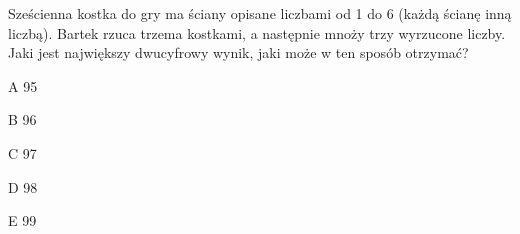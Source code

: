 \begin{tresc}
Sześcienna kostka do gry ma ściany opisane liczbami od 1 do 6 (każdą ścianę inną liczbą). Bartek rzuca trzema kostkami, a następnie mnoży trzy wyrzucone liczby. Jaki jest największy dwucyfrowy wynik, jaki może w ten sposób otrzymać?
\end{tresc}
\begin{wariant}{A} 95 \end{wariant}
\begin{wariant}{B} 96 \end{wariant}
\begin{wariant}{C} 97 \end{wariant}
\begin{wariant}{D} 98 \end{wariant}
\begin{wariant}{E} 99 \end{wariant}
